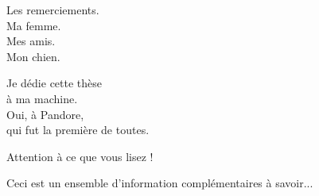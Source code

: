 \documentclass[11pt]{thesul}
\begin{document}
\MakeThesisTitlePage


\begin{ThesisAcknowledgments}
    Les remerciements.\\
    Ma femme.\\
    Mes amis.\\
    Mon chien.\\
\end{ThesisAcknowledgments}


\begin{ThesisDedication}
    Je dédie cette thèse\\
    à ma machine.\\
    Oui, à Pandore,\\
    qui fut la première de toutes.
\end{ThesisDedication}


\WritePartLabelInToc

\WriteChapterLabelInToc

\tableofcontents

\listoffigures



Attention à ce que vous lisez !


Ceci est un ensemble d'information complémentaires à savoir...

\mainmatter
\end{document}
